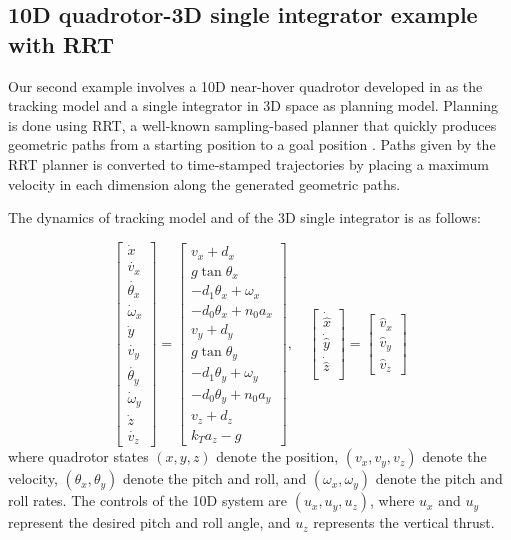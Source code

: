 \subsection{10D quadrotor-3D single integrator example with RRT\label{sec:resultsRRT}}

Our second example involves a 10D near-hover quadrotor developed in \cite{Bouffard12} as the tracking model and a single integrator in 3D space as planning model.
Planning is done using RRT, a well-known sampling-based planner that quickly produces geometric paths from a starting position to a goal position \cite{Kuffner2000,Kavraki1996}.
Paths given by the RRT planner is converted to time-stamped trajectories by placing a maximum velocity in each dimension along the generated geometric paths.

The dynamics of tracking model and of the 3D single integrator is as follows:

\begin{equation}
\label{eq:Quad10D_dyn}
\begin{bmatrix}
\dot{x}\\
\dot{v_x}\\
\dot{\theta_x}\\
\dot\omega_x\\
\dot{y}\\
\dot{v_y}\\
\dot{\theta_y}\\
\dot\omega_y\\
\dot{z}\\
\dot{v_z}
\end{bmatrix}
=
\begin{bmatrix}
v_x + d_x\\
g \tan \theta_x\\
-d_1 \theta_x + \omega_x\\
-d_0 \theta_x + n_0 a_x\\
v_y + d_y\\
g \tan \theta_y\\
-d_1 \theta_y + \omega_y\\
-d_0 \theta_y + n_0 a_y\\
v_z + d_z\\
k_T a_z - g
\end{bmatrix}, \quad
\begin{bmatrix}
\dot{\hat x}\\
\dot{\hat y}\\
\dot{\hat z}\\
\end{bmatrix} =
\begin{bmatrix}
\hat v_x \\
\hat v_y \\
\hat v_z
\end{bmatrix}
\end{equation}
\noindent where quadrotor states $(x, y, z)$ denote the position, $(v_x, v_y, v_z)$ denote the velocity, $(\theta_x, \theta_y)$ denote the pitch and roll, and $(\omega_x, \omega_y)$ denote the pitch and roll rates. 
The controls of the 10D system are $(u_x, u_y, u_z)$, where $u_x$ and $u_y$ represent the desired pitch and roll angle, and $u_z$ represents the vertical thrust.

